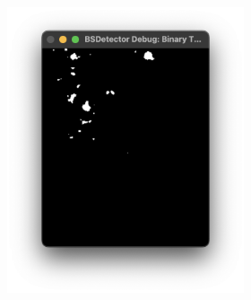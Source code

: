 \begin{figure}[H]
\begin{subfigure}{.6\textwidth}
\begin{subfigure}{0.32\textwidth}
            \caption{}
            \label{fig:sys_gb}
        \end{subfigure}
        \hfill
        \begin{subfigure}{0.32\textwidth}
            \centering
            \includegraphics[width=1\linewidth]{assets/sys_thresh.png}
            \caption{}
            \label{fig:sys_thresh}
        \end{subfigure}
        \hfill
        \begin{subfigure}{0.32\textwidth}
            \centering

\end{subfigure}
\end{subfigure}
\end{figure}
